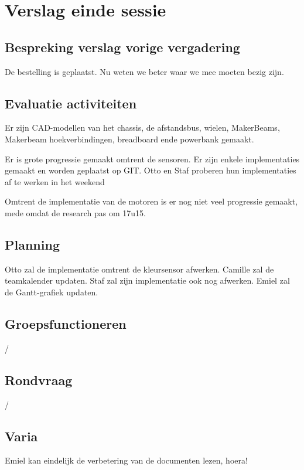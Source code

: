 \documentclass[a4paper,kulak]{kulakarticle} %
\begin{document}
\section{Verslag einde sessie}

\subsection{Bespreking verslag vorige vergadering}
De bestelling is geplaatst. Nu weten we beter waar we mee moeten bezig zijn.

\subsection{Evaluatie activiteiten}
Er zijn CAD-modellen van het chassis, de afstandsbus, wielen, MakerBeams, Makerbeam hoekverbindingen, breadboard ende powerbank gemaakt.

Er is grote progressie gemaakt omtrent de sensoren. Er zijn enkele implementaties gemaakt en worden geplaatst op GIT. Otto en Staf proberen hun implementaties af te werken in het weekend

Omtrent de implementatie van de motoren is er nog niet veel progressie gemaakt, mede omdat de research pas om 17u15. 

\subsection{Planning}
Otto zal de implementatie omtrent de kleursensor afwerken. Camille zal de teamkalender updaten. Staf zal zijn implementatie ook nog afwerken. Emiel zal de Gantt-grafiek updaten. 

\subsection{Groepsfunctioneren}
/

\subsection{Rondvraag}
/

\subsection{Varia}
Emiel kan eindelijk de verbetering van de documenten lezen, hoera!
\end{document}
